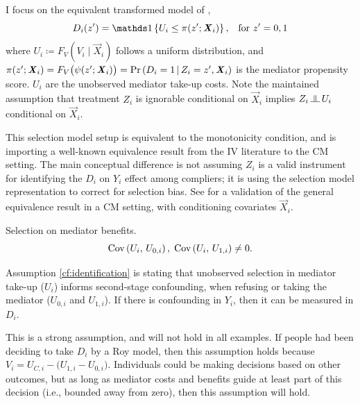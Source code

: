 I focus on the equivalent transformed model of \cite{heckman2005structural},
\[ D_i(z') = \indicator{U_i \leq \pi(z'; \vec X_i)},
    \;\;\; \text{for } z'=0,1 \]
where $U_i \coloneqq F_V\left( V_i \mid \vec X_i \right)$ follows a uniform distribution, and $\pi(z'; \boldsymbol{\mathit{X}}_i) = F_V\big(\psi(z'; \boldsymbol{\mathit{X}}_i)\big) = \Pr\left( D_i = 1 \, \middle\vert \, Z_i = z', \boldsymbol{\mathit{X}}_i \right)$ is the mediator propensity score.
$U_i$ are the unobserved mediator take-up costs.
Note the maintained assumption that treatment $Z_i$ is ignorable conditional on $\vec X_i$ implies $Z_i \indep U_i$ conditional on $\vec X_i$.

This selection model setup is equivalent to the monotonicity condition, and is importing a well-known equivalence result from the IV literature to the CM setting.
The main conceptual difference is not assuming $Z_i$ is a valid instrument for identifying the $D_i$ on $Y_i$ effect among compliers; it is using the selection model representation to correct for selection bias.
See  for a validation of the general \cite{vytlacil2002independence} equivalence result in a CM setting, with conditioning covariates $\vec X_i$.

\begin{assumptionCF}
    \label{cf:identification}
    Selection on mediator benefits.
    \[ \text{Cov} \left( U_i, \, U_{0,i} \right), \; \text{Cov} \left( U_i, \, U_{1,i} \right) \neq 0. \]
\end{assumptionCF}
\noindent
Assumption \ref{cf:identification} is stating that unobserved selection in mediator take-up ($U_i$) informs second-stage confounding, when refusing or taking the mediator ($U_{0,i}$ and $U_{1,i}$).
If there is confounding in $Y_i$, then it can be measured in $D_i$.

This is a strong assumption, and will not hold in all examples.
If people had been deciding to take $D_i$ by a Roy model, then this assumption holds because $V_i = U_{C,i} - \big( U_{1,i} - U_{0,i} \big)$.
Individuals could be making decisions based on other outcomes, but as long as mediator costs and benefits guide at least part of this decision (i.e., bounded away from zero), then this assumption will hold.

